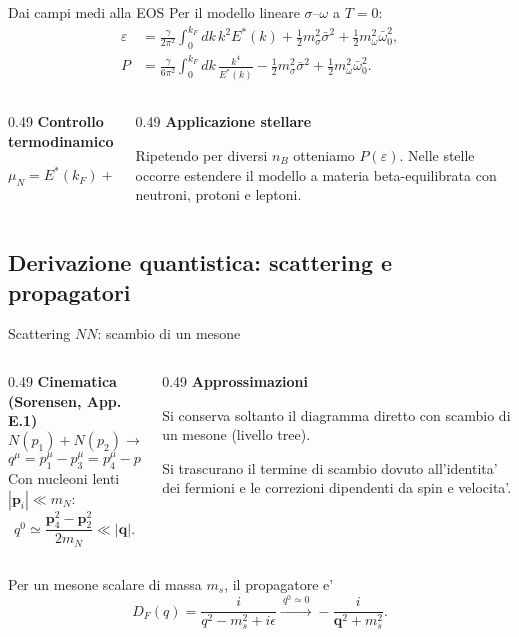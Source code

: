 \begin{frame}{Dai campi medi alla EOS}
\footnotesize
Per il modello lineare \(\sigma\)--\(\omega\) a \(T=0\):
\[
\begin{aligned}
\varepsilon&=\frac{\gamma}{2\pi^2}\int_0^{k_F}\!dk\,k^2E^*(k)
+\frac12m_\sigma^2\bar\sigma^2
+\frac12m_\omega^2\bar\omega_0^2,\\
P&=\frac{\gamma}{6\pi^2}\int_0^{k_F}\!dk\,\frac{k^4}{E^*(k)}
-\frac12m_\sigma^2\bar\sigma^2
+\frac12m_\omega^2\bar\omega_0^2.
\end{aligned}
\]
\begin{columns}[T,onlytextwidth]
\begin{column}{0.49\textwidth}
\textbf{Controllo termodinamico}\par\smallskip
\[
\mu_N=E^*(k_F)+V_N,
\qquad P=n_B\mu_N-\varepsilon.
\]
\end{column}
\begin{column}{0.49\textwidth}
\textbf{Applicazione stellare}\par\smallskip
Ripetendo per diversi \(n_B\) otteniamo
\(P(\varepsilon)\). Nelle stelle occorre
estendere il modello a materia beta-equilibrata
con neutroni, protoni e leptoni.
\end{column}
\end{columns}
\end{frame}

\subsection{Derivazione quantistica: scattering e propagatori}

\begin{frame}{Scattering $NN$: scambio di un mesone}
\small
\begin{columns}[T,onlytextwidth]
\begin{column}{0.49\textwidth}
\textbf{Cinematica (Sorensen, App. E.1)}
\[
N(p_1)+N(p_2)\to N(p_3)+N(p_4)
\]
\[
q^\mu=p_1^\mu-p_3^\mu=p_4^\mu-p_2^\mu.
\]
Con nucleoni lenti \(|\mathbf p_i|\ll m_N\):
\[
q^0\simeq\frac{\mathbf p_4^2-\mathbf p_2^2}{2m_N}
\ll|\mathbf q|.
\]
\end{column}
\begin{column}{0.49\textwidth}
\textbf{Approssimazioni}\par\smallskip
Si conserva soltanto il diagramma diretto
con scambio di un mesone (livello tree).\par\smallskip
Si trascurano il termine di scambio dovuto
all'identita' dei fermioni e le correzioni
dipendenti da spin e velocita'.
\end{column}
\end{columns}
\medskip
Per un mesone scalare di massa \(m_s\), il propagatore e'
\[
D_F(q)=\frac{i}{q^2-m_s^2+i\epsilon}
\xrightarrow{\ q^0\simeq0\ }
-\frac{i}{\mathbf q^2+m_s^2}.
\]
\end{frame}

